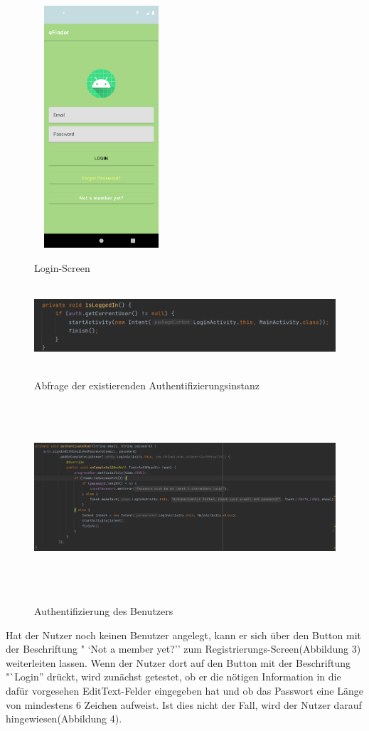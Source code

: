 \documentclass[12pt, a4paper, oneside]{article}
\begin{document}
\begin{figure}
\includegraphics[width=5cm, height=9cm]{Login-Screen.png}
\centering
\label{login}
\caption{Login-Screen}
\end{figure}
\begin{figure}
\includegraphics[width=1\textwidth, height=3cm]{isLoggedIn.png}
\centering
\label{isLoggedIn}
\caption{Abfrage der existierenden Authentifizierungsinstanz}
\end{figure}
\begin{figure}
\includegraphics[width=1\textwidth, height=7cm]{authentication.png}
\centering
\label{authentication}
\caption{Authentifizierung des Benutzers}
\end{figure}
Hat der Nutzer noch keinen Benutzer angelegt, kann er sich über den Button mit der Beschriftung " `Not a member yet?'' zum Registrierungs-Screen(Abbildung 3) weiterleiten lassen. Wenn der Nutzer dort auf den Button mit der Beschriftung "`Login'' drückt, wird zunächst getestet, ob er die nötigen Information in die dafür vorgesehen EditText-Felder eingegeben hat und ob das Passwort eine Länge von mindestens 6 Zeichen aufweist. Ist dies nicht der Fall, wird der Nutzer darauf hingewiesen(Abbildung 4).\\
\end{document}
